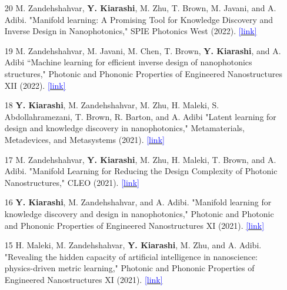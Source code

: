 \documentclass[margin, line]{res}
\newenvironment{list1}{
  \begin{list}{\ding{113}}{%
      \setlength{\itemsep}{0in}
      \setlength{\parsep}{0in} \setlength{\parskip}{0in}
      \setlength{\topsep}{0in} \setlength{\partopsep}{0in} 
      \setlength{\leftmargin}{0.17in}}}{\end{list}}
\begin{document}
\begin{resume}
\begin{list1}
\begin{itemize}
\item[20] M. Zandehshahvar, \textbf{Y. Kiarashi}, M. Zhu, T. Brown, M. Javani, and A. Adibi. "Manifold learning: A Promising Tool for Knowledge Discovery and Inverse Design in Nanophotonics," SPIE Photonics West (2022). \href{https://opg.optica.org/abstract.cfm?uri=CLEO_SI-2021-JTu3A.115}{\textcolor{blue}{[link]}}

\item [19] M. Zandehshahvar, M. Javani, M. Chen, T. Brown, \textbf{Y. Kiarashi}, and A. Adibi “Machine learning for efficient inverse design of nanophotonics structures," Photonic and Phononic Properties of Engineered Nanostructures XII (2022). \href{https://www.spiedigitallibrary.org/conference-proceedings-of-spie/PC12010/PC120100W/Machine-learning-for-efficient-inverse-design-of-nanophotonics-structures/10.1117/12.2617485.short}{\textcolor{blue}{[link]}}

\item [18] \textbf{Y. Kiarashi}, M. Zandehshahvar, M. Zhu, H. Maleki, S. Abdollahramezani, T. Brown, R.  Barton, and A. Adibi "Latent learning for design and knowledge discovery in nanophotonics," Metamaterials, Metadevices, and Metasystems (2021). \href{https://www.spiedigitallibrary.org/conference-proceedings-of-spie/11795/1179505/Latent-learning-for-design-and-knowledge-discovery-in-nanophotonics/10.1117/12.2595199.short}{\textcolor{blue}{[link]}}

\item [17] M. Zandehshahvar, \textbf{Y. Kiarashi}, M. Zhu, H. Maleki, T. Brown, and A. Adibi. "Manifold Learning for Reducing the Design Complexity of Photonic Nanostructures," CLEO (2021). \href{https://opg.optica.org/abstract.cfm?uri=CLEO_SI-2021-JTu3A.115}{\textcolor{blue}{[link]}}

\item [16] \textbf{Y. Kiarashi}, M. Zandehshahvar, and A. Adibi. "Manifold learning for knowledge discovery and design in nanophotonics," Photonic and Photonic and Phononic Properties of Engineered Nanostructures XI (2021). \href{https://scholar.google.com/citations?view_op=view_citation&hl=en&user=2GjI4oMAAAAJ&cstart=20&pagesize=80&sortby=pubdate&citation_for_view=2GjI4oMAAAAJ:0EnyYjriUFMC}{\textcolor{blue}{[link]}}

\item [15] H. Maleki, M. Zandehshahvar, \textbf{Y. Kiarashi}, M. Zhu, and A. Adibi. "Revealing the hidden capacity of artificial intelligence in nanoscience: physics-driven metric learning," Photonic and Phononic Properties of Engineered Nanostructures XI (2021). \href{https://ml4eng.github.io/camera_readys/18.pdf}{\textcolor{blue}{[link]}}


\end{itemize}
\end{list1}
\end{resume}
\end{document}
